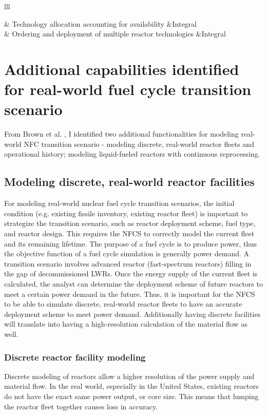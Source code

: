 \begin{table}[h]
\begin{tabular}{lll}
        \hline

         & Technology allocation accounting for availability &Integral \\
        	& Ordering and deployment of multiple reactor technologies &Integral \\
        \hline
    \end{tabular}
\end{table}

\section{Additional capabilities identified for real-world fuel cycle transition scenario}
From Brown et al. \cite{brown_identification_2016}, I identified two additional functionalities 
for modeling real-world \gls{NFC} transition scenario -
modeling discrete, real-world reactor fleets and operational history; modeling liquid-fueled
reactors with continuous reprocessing.

\subsection{Modeling discrete, real-world reactor facilities}
For modeling real-world nuclear fuel cycle transition scenarios, the initial
condition (e.g. existing fissile inventory, existing reactor fleet) is important
to strategize the transition scenario, such as reactor deployment
scheme, fuel type, and reactor design. This requires the \gls{NFCS} to correctly model the current fleet and its
remaining lifetime. The purpose of a fuel cycle is to produce power, thus the objective
function of a fuel cycle simulation is generally power demand. A transition
scenario involves advanced reactor (fast-spectrum reactors) filling in the
gap of decommissioned \glspl{LWR}.
Once the energy supply of the current fleet is calculated,
the analyst can determine the deployment scheme of future reactors to meet a certain
power demand in the future. Thus, it is important for the \gls{NFCS} to be able to simulate
discrete, real-world reactor fleets to have an accurate deployment scheme to
meet power demand. Additionally having discrete facilities will translate into
having a high-resolution calculation of the material flow as well.

\subsubsection{Discrete reactor facility modeling}
Discrete modeling of reactors allow a higher resolution of the power supply and
material flow. In the real world, especially in the United States, existing
reactors do not have the exact same power output, or core size. This means that
lumping the reactor fleet together causes loss in accuracy.

